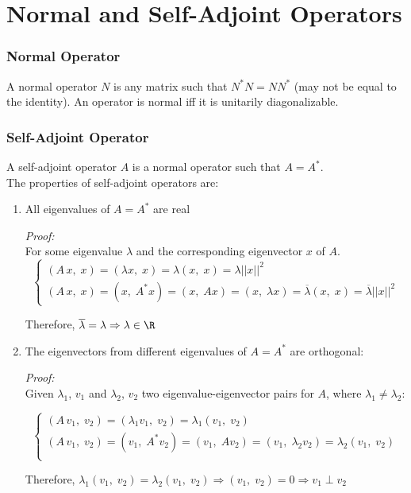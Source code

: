 \section*{Normal and Self-Adjoint Operators}

\subsubsection*{Normal Operator}
A normal operator $N$ is any matrix such that $N^*N=NN^*$ (may not be equal to the identity). An operator is normal iff it is unitarily diagonalizable.

\subsubsection*{Self-Adjoint Operator}
A self-adjoint operator $A$ is a normal operator such that $A=A^*$.\\
The properties of self-adjoint operators are: 

\begin{enumerate}[label=(\roman*)]
    \item All eigenvalues of $A=A^*$ are real
    
    \textit{Proof:}\\
    For some eigenvalue $\lambda$ and the corresponding eigenvector $x$ of $A$.
    $$\begin{cases}
      (A\,x,\;x)=(\lambda x,\;x)=\lambda (x,\;x)=\lambda ||x||^2\\
      (A\,x,\;x)=(x,\;A^*x)=(x,\;Ax)=(x,\;\lambda x)=\overline{\lambda}(x,\;x)=\overline{\lambda} ||x||^2
    \end{cases}$$
    
    Therefore, $\overline{\lambda}=\lambda\Rightarrow\lambda \in \R$
    
    \item The eigenvectors from different eigenvalues of $A=A^*$ are orthogonal:
    
    \textit{Proof:}\\
    Given $\lambda_1$, $v_1$ and $\lambda_2$, $v_2$ two eigenvalue-eigenvector pairs for $A$, where $\lambda_1 \neq \lambda_2$:
    
    $$\begin{cases}
      (A\,v_1,\;v_2)=(\lambda_1 v_1,\;v_2)=\lambda_1 (v_1,\;v_2)\\
      (A\,v_1,\;v_2)=(v_1,\;A^*v_2)=(v_1,\;Av_2)=(v_1,\;\lambda_2v_2)=\lambda_2 (v_1,\;v_2)\\
    \end{cases}$$
    
    Therefore, $\lambda_1 (v_1,\;v_2)=\lambda_2 (v_1,\;v_2)\Rightarrow (v_1,\;v_2)=0\Rightarrow v_1\perp v_2$
\end{enumerate}

